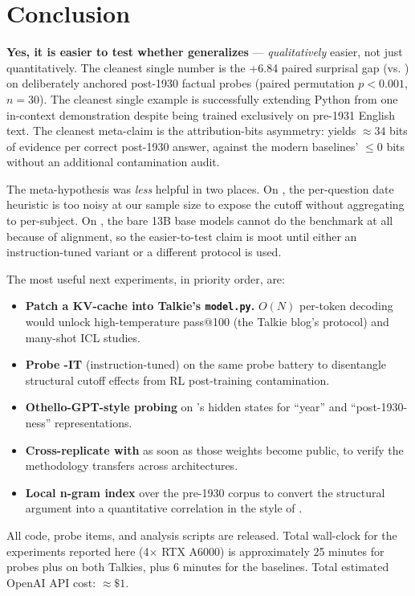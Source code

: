 \section{Conclusion}
\label{sec:conclusion}

\textbf{Yes, it is easier to test whether \talkienineteen generalizes} --- \emph{qualitatively} easier, not just quantitatively. The cleanest single number is the +6.84 \bpt paired surprisal gap (\talkienineteen vs. \talkieweb) on deliberately anchored post-1930 factual probes (paired permutation $p < 0.001$, $n=30$). The cleanest single example is \talkienineteen successfully extending Python from one in-context demonstration despite being trained exclusively on pre-1931 English text. The cleanest meta-claim is the attribution-bits asymmetry: \talkienineteen yields $\approx 34$ bits of evidence per correct post-1930 answer, against the modern baselines' $\le 0$ bits without an additional contamination audit.

The meta-hypothesis was \emph{less} helpful in two places. On \mmlu, the per-question date heuristic is too noisy at our sample size to expose the cutoff without aggregating to per-subject. On \humaneval, the bare 13B base models cannot do the benchmark at all because of alignment, so the easier-to-test claim is moot until either an instruction-tuned variant or a different protocol is used.

 The most useful next experiments, in priority order, are:
\begin{itemize}[leftmargin=*,itemsep=0pt,topsep=0pt]
    \item \textbf{Patch a KV-cache into Talkie's \texttt{model.py}.} $O(N)$ per-token decoding would unlock high-temperature pass@100 \humaneval (the Talkie blog's protocol) and many-shot ICL studies.
    \item \textbf{Probe \talkienineteen-IT} (instruction-tuned) on the same probe battery to disentangle structural cutoff effects from RL post-training contamination.
    \item \textbf{Othello-GPT-style probing} on \talkienineteen's hidden states for ``year'' and ``post-1930-ness'' representations.
    \item \textbf{Cross-replicate with } as soon as those weights become public, to verify the methodology transfers across architectures.
    \item \textbf{Local n-gram index} over the pre-1930 corpus to convert the structural argument into a quantitative correlation in the style of \citet{wang2025generalization}.
\end{itemize}

All code, probe items, and analysis scripts are released. Total wall-clock for the experiments reported here (4$\times$ RTX A6000) is approximately 25 minutes for probes plus \mmlu on both Talkies, plus 6 minutes for the \gptfour baselines. Total estimated OpenAI API cost: $\approx \$1$.

